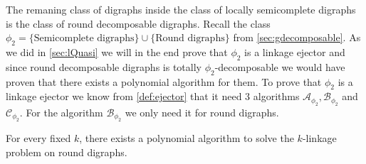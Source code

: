 The remaning class of digraphs inside the class of locally semicomplete digraphs is the class of round decomposable digraphs. 
Recall the class $\phi_2=\lbrace\text{Semicomplete digraphs}\rbrace\cup\lbrace\text{Round digraphs}\rbrace$ from \autoref{sec:gdecomposable}.
As we did in \autoref{sec:lQuasi} we will in the end prove that $\phi_2$ is a linkage ejector and since round decomposable digraphs is totally $\phi_2$-decomposable we would have proven that there exists a polynomial algorithm for them.
To prove that $\phi_2$ is a linkage ejector we know from \autoref{def:ejector} that it need 3 algorithms $\mathcal{A}_{\phi_2},\mathcal{B}_{\phi_2}$ and $\mathcal{C}_{\phi_2}$. For the algorithm $\mathcal{B}_{\phi_2}$ we only need it for round digraphs.
\begin{thm}
    For every fixed $k$, there exists a polynomial algorithm to solve the $k$-linkage problem on round digraphs.
    \label{thm:roundklink}
\end{thm}
